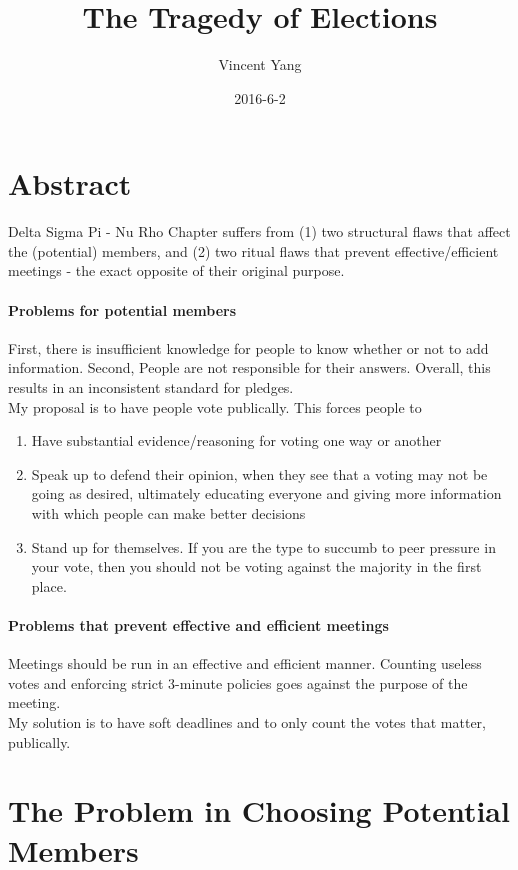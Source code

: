\documentclass{article}
\title{The Tragedy of Elections}
\date{2016-6-2}
\author{Vincent Yang}
\begin{document}
  \maketitle
  \newpage
  \section{Abstract}
  Delta Sigma Pi - Nu Rho Chapter suffers from (1) two structural flaws that affect the (potential) members,
  and (2) two ritual flaws that prevent effective/efficient meetings - the exact opposite of their original purpose.
  \paragraph{Problems for potential members}First, there is insufficient %
  knowledge for people to know whether or not to add information. Second, People are not responsible
  for their answers. Overall, this results in an inconsistent standard for pledges.\\
  My proposal is to have people vote publically. This forces people to 
  \begin{enumerate}
    \item Have substantial evidence/reasoning for voting one way or another
    \item Speak up to defend their opinion, when they see that a voting may not be going as desired, ultimately educating everyone and giving more information with 
      which people can make better decisions
    \item Stand up for themselves. If you are the type to succumb to peer pressure in your vote, then you should not be voting against the majority in the first place.
  \end{enumerate}

  \paragraph{Problems that prevent effective and efficient meetings}
  Meetings should be run in an effective and efficient manner. Counting useless votes and
  enforcing strict 3-minute policies goes against the purpose of the meeting.\\
  My solution is to have soft deadlines and to only count the votes that matter, publically.

  \section{The Problem in Choosing Potential Members}
\end{document}
